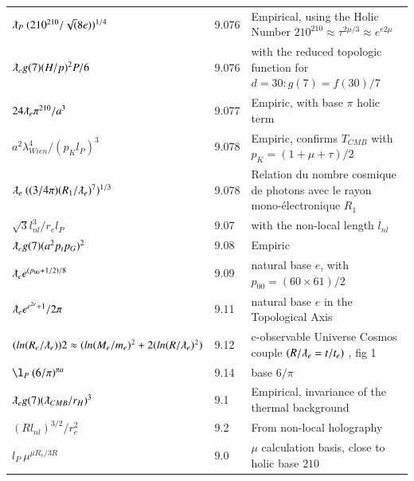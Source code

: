 \documentclass[a4paper,9pt]{article}
\begin{document}
\begin{table}
\begin{tabular}{lll}
   
   $  \lambdabar_P ~ (210^{210}/\sqrt(8e))^{1/4}$  & 9.076 & Empirical, using the Holic Number $210^{210}\approx \tau^{2\mu/3}\approx e^{e2\mu}$  \\
   
    
   $ \lambdabar_eg(7) (H/p)^2  P/6 $ & 9.076 & with the reduced topologic function for $d = 30: g(7) = f(30)/7$ \cite{Sanchez2}  \\
   
    
    $ 24 \lambdabar_e  \pi^{210}/a^3 $ & 9.077 & Empiric, with base $\pi$ holic term \\
    
    $ a^2 \lambda_{Wien}^4/(p_Kl_P)^3 $ & 9.078 & Empiric, confirms $T_{CMB}$ with $p_K = (1+\mu +\tau)/2$ \cite{Koide} \\

    
     $  \lambdabar_e ~  ((3/4\pi)(R_1/\lambdabar_e)^7)^{1/3}   $ & 9.078 & Relation du nombre cosmique de photons avec le rayon mono-électronique $R_1$  \\
    
  
  $ \sqrt 3l_{nl}^3/r_el_P $ & 9.07 & with the non-local length $l_{nl}$  \\
  
  $ \lambdabar_e g(7) (a^2p_tp_G)^2 $ & 9.08 & Empiric \cite{Sanchez2}  \\
  
  $ \lambdabar_e e^{(p_{00}+1/2)/8} $ & 9.09 & natural base $e$, with $p_{00} = (60 \times 61)/2$ \\
  
  
  
  $ \lambdabar_e e^{e^{2e}+1}/2\pi $ & 9.11 & natural base $e$ in the Topological Axis\\
  
 $ (ln(R_c/\lambdabar_e)) 2 \approx (ln(M_e/m_e)^2 + 2(ln(R/\lambdabar_e)^2) $ & 9.12 & c-observable Universe  Cosmos couple $(R/\lambdabar_e = t/t_e)$ , fig 1   \\
 
  
  
  $  \l_P ~ (6/\pi)^{\pi a}  $ & 9.14 & base $6/\pi$  \\
  
  
  
 $ \lambdabar_e g(7) (\lambdabar_{CMB}/r_H)^3 $ & 9.1 & Empirical, invariance of the thermal background \cite{Sanchez2}  \\
 
 $  (Rl_{nl})^{3/2}/r_e^2 $ & 9.2 & From non-local holography \cite{Sanchez2}  \\
 
  $  l_P ~ \mu^{\mu R_e/3R}  $ & 9.0 & $\mu$ calculation basis, close to holic base $210$   \\
  
  
  
  
 
 \bottomrule
  \end{tabular}
\end{table} 
  
\end{document}
